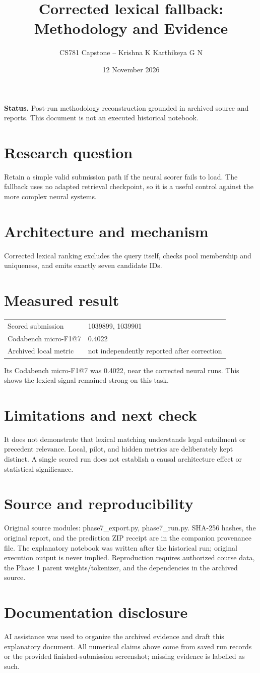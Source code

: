 \documentclass[11pt,a4paper]{article}
\title{Corrected lexical fallback: Methodology and Evidence}
\author{CS781 Capstone -- Krishna K Karthikeya G N}
\date{12 November 2026}
\begin{document}
\maketitle
\noindent\textbf{Status.} Post-run methodology reconstruction grounded in archived source and reports. This document is not an executed historical notebook.\par
\section*{Research question}
Retain a simple valid submission path if the neural scorer fails to load. The fallback uses no adapted retrieval checkpoint, so it is a useful control against the more complex neural systems.
\section*{Architecture and mechanism}
Corrected lexical ranking excludes the query itself, checks pool membership and uniqueness, and emits exactly seven candidate IDs.
\section*{Measured result}
\begin{center}\begin{tabular}{ll}Scored submission & 1039899, 1039901\\
Codabench micro-F1@7 & 0.4022\\
Archived local metric & not independently reported after correction\end{tabular}\end{center}
Its Codabench micro-F1@7 was 0.4022, near the corrected neural runs. This shows the lexical signal remained strong on this task.
\section*{Limitations and next check}
It does not demonstrate that lexical matching understands legal entailment or precedent relevance. Local, pilot, and hidden metrics are deliberately kept distinct. A single scored run does not establish a causal architecture effect or statistical significance.
\section*{Source and reproducibility}
Original source modules: phase7\_export.py, phase7\_run.py. SHA-256 hashes, the original report, and the prediction ZIP receipt are in the companion provenance file. The explanatory notebook was written after the historical run; original execution output is never implied. Reproduction requires authorized course data, the Phase 1 parent weights/tokenizer, and the dependencies in the archived source.
\section*{Documentation disclosure}
AI assistance was used to organize the archived evidence and draft this explanatory document. All numerical claims above come from saved run records or the provided finished-submission screenshot; missing evidence is labelled as such.
\end{document}
